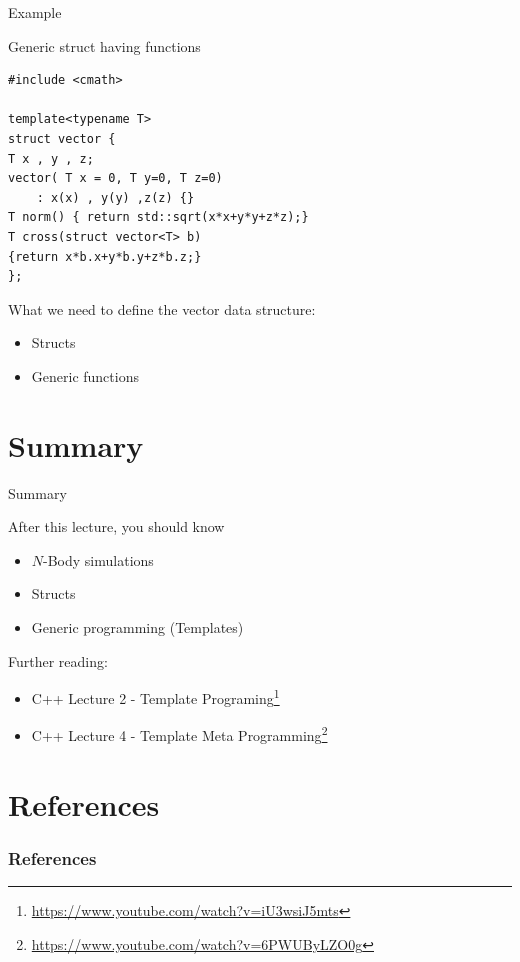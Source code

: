 \documentclass[\classoption]{beamer}
\begin{document}
\begin{frame}[fragile]{Example}
\begin{block}{Generic struct having functions}
\begin{lstlisting}
#include <cmath>

template<typename T>
struct vector {
T x , y , z;
vector( T x = 0, T y=0, T z=0)
	: x(x) , y(y) ,z(z) {}
T norm() { return std::sqrt(x*x+y*y+z*z);}
T cross(struct vector<T> b)
{return x*b.x+y*b.y+z*b.z;}
};
\end{lstlisting}
\end{block}

\begin{block}{What we need to define the vector data structure:}
\begin{itemize}
\item Structs
\item Generic functions
\end{itemize}
\end{block}

\end{frame}





\section{Summary}
\begin{frame}{Summary}
\begin{block}{After this lecture, you should know}
\begin{itemize}
\item $N$-Body simulations
\item Structs
\item Generic programming (Templates)
\end{itemize}
\end{block}

\begin{block}{Further reading:}
\begin{itemize}
\item C++ Lecture 2 - Template Programing\footnote{\tiny\url{https://www.youtube.com/watch?v=iU3wsiJ5mts}}
\item C++ Lecture 4 - Template Meta Programming\footnote{\tiny\url{https://www.youtube.com/watch?v=6PWUByLZO0g}}
\end{itemize}


\end{block}



\end{frame}



\section{References}

\begin{frame}[t, allowframebreaks]
\frametitle{References}


\end{frame}
\end{document}
